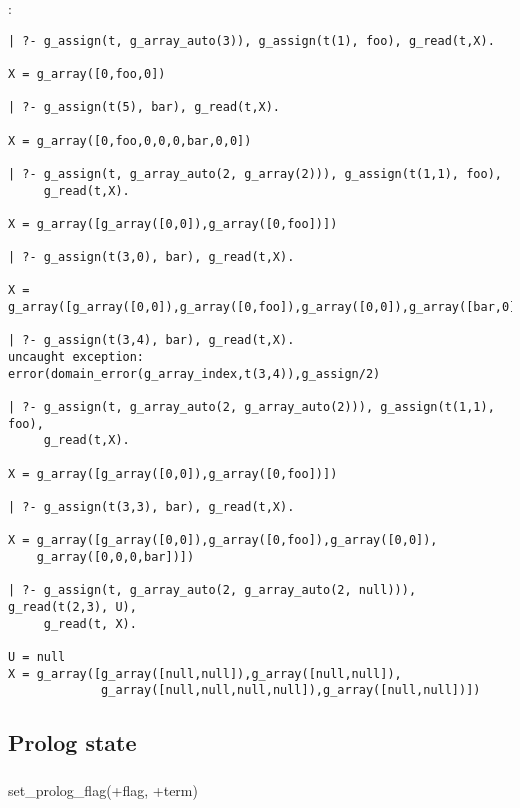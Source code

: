 :

\begin{Indentation}
\begin{verbatim}
| ?- g_assign(t, g_array_auto(3)), g_assign(t(1), foo), g_read(t,X).

X = g_array([0,foo,0])

| ?- g_assign(t(5), bar), g_read(t,X).

X = g_array([0,foo,0,0,0,bar,0,0])

| ?- g_assign(t, g_array_auto(2, g_array(2))), g_assign(t(1,1), foo),
     g_read(t,X).

X = g_array([g_array([0,0]),g_array([0,foo])])

| ?- g_assign(t(3,0), bar), g_read(t,X).

X = g_array([g_array([0,0]),g_array([0,foo]),g_array([0,0]),g_array([bar,0])])

| ?- g_assign(t(3,4), bar), g_read(t,X).
uncaught exception: error(domain_error(g_array_index,t(3,4)),g_assign/2)

| ?- g_assign(t, g_array_auto(2, g_array_auto(2))), g_assign(t(1,1), foo),
     g_read(t,X).

X = g_array([g_array([0,0]),g_array([0,foo])])

| ?- g_assign(t(3,3), bar), g_read(t,X).

X = g_array([g_array([0,0]),g_array([0,foo]),g_array([0,0]),
    g_array([0,0,0,bar])])

| ?- g_assign(t, g_array_auto(2, g_array_auto(2, null))), g_read(t(2,3), U),
     g_read(t, X).

U = null
X = g_array([g_array([null,null]),g_array([null,null]),
             g_array([null,null,null,null]),g_array([null,null])])
\end{verbatim}
\end{Indentation}

\subsection{Prolog state}

\subsubsection{\label{set-prolog-flag/2}}

\begin{TemplatesOneCol}
set\_prolog\_flag(+flag, +term)

\end{TemplatesOneCol}


